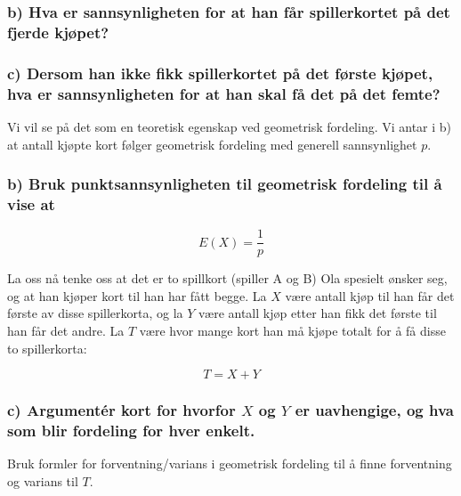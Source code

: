 \documentclass[
  12pt,
  a4paper,
  DIV=11,
  numbers=noendperiod]{scrartcl}
\begin{document}
\subsubsection{b) Hva er sannsynligheten for at han får spillerkortet på
det fjerde
kjøpet?}\label{b-hva-er-sannsynligheten-for-at-han-fuxe5r-spillerkortet-puxe5-det-fjerde-kjuxf8pet}

\subsubsection{c) Dersom han ikke fikk spillerkortet på det første
kjøpet, hva er sannsynligheten for at han skal få det på det
femte?}\label{c-dersom-han-ikke-fikk-spillerkortet-puxe5-det-fuxf8rste-kjuxf8pet-hva-er-sannsynligheten-for-at-han-skal-fuxe5-det-puxe5-det-femte}

Vi vil se på det som en teoretisk egenskap ved geometrisk fordeling. Vi
antar i b) at antall kjøpte kort følger geometrisk fordeling med
generell sannsynlighet \(p\).

\subsubsection{b) Bruk punktsannsynligheten til geometrisk fordeling til
å vise
at}\label{b-bruk-punktsannsynligheten-til-geometrisk-fordeling-til-uxe5-vise-at}

\[ E(X) = \frac{1}{p} \]

La oss nå tenke oss at det er to spillkort (spiller A og B) Ola spesielt
ønsker seg, og at han kjøper kort til han har fått begge. La \(X\) være
antall kjøp til han får det første av disse spillerkorta, og la \(Y\)
være antall kjøp etter han fikk det første til han får det andre. La
\(T\) være hvor mange kort han må kjøpe totalt for å få disse to
spillerkorta:

\[ T = X + Y \]

\subsubsection{\texorpdfstring{c) Argumentér kort for hvorfor \(X\) og
\(Y\) er uavhengige, og hva som blir fordeling for hver
enkelt.}{c) Argumentér kort for hvorfor X og Y er uavhengige, og hva som blir fordeling for hver enkelt.}}\label{c-argumentuxe9r-kort-for-hvorfor-x-og-y-er-uavhengige-og-hva-som-blir-fordeling-for-hver-enkelt.}

Bruk formler for forventning/varians i geometrisk fordeling til å finne
forventning og varians til \(T\).
\end{document}
